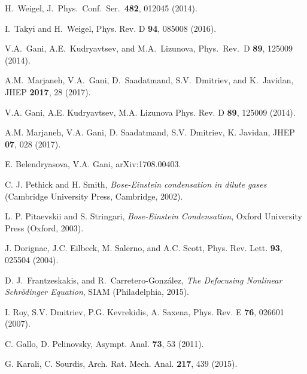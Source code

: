 \documentclass[vecphys]{svmult}		%
\begin{document}
{\begin{thebibliography}{99.}
 H.~Weigel,
  J.\ Phys.\ Conf.\ Ser.\ {\bf 482}, 012045 (2014).

 I.~Takyi and H.~Weigel,
  Phys. Rev. D {\bf 94}, 085008 (2016).


 V.A.~Gani, A.E.~Kudryavtsev, and M.A.~Lizunova,
  Phys.\ Rev.\ D {\bf 89}, 125009 (2014).
%

 A.M.~Marjaneh, V.A.~Gani, D.~Saadatmand, S.V.~Dmitriev, and K.~Javidan,
JHEP {\bf 2017}, 28 (2017).

  V.A. Gani, A.E. Kudryavtsev, M.A. Lizunova
Phys. Rev. D {\bf 89}, 125009 (2014). 

  A.M. Marjaneh, V.A. Gani, D. Saadatmand, S.V. Dmitriev,
K. Javidan,
JHEP {\bf 07}, 028 (2017).

 E. Belendryasova, V.A. Gani,
 arXiv:1708.00403.

 C. J. Pethick and H. Smith,
{\it Bose-Einstein condensation in dilute gases}
(Cambridge University Press, Cambridge, 2002).


 L. P. Pitaevskii and S. Stringari,
{\it Bose-Einstein Condensation}, Oxford University Press (Oxford, 2003).

 J. Dorignac, J.C. Eilbeck, M. Salerno,  and A.C. Scott,
  Phys. Rev. Lett. {\bf 93}, 025504 (2004).


 D. J.~Frantzeskakis, and R.~Carretero-Gonz\'alez,
{\it The Defocusing Nonlinear Schr{\"o}dinger Equation},
SIAM (Philadelphia, 2015).



 I. Roy, S.V. Dmitriev, P.G. Kevrekidis, A. Saxena,
Phys. Rev. E {\bf 76}, 026601 (2007).


 C. Gallo, D. Pelinovsky, Asympt. Anal. {\bf 73}, 53 (2011).

 G. Karali, C. Sourdis, Arch. Rat. Mech. Anal.
{\bf 217}, 439 (2015). 


\end{thebibliography}}
\end{document}
